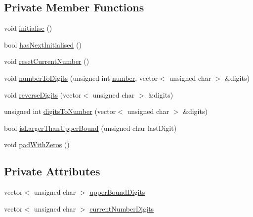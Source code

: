\subsection*{Private Member Functions}
\begin{DoxyCompactItemize}
\item 
void \hyperlink{classmultiscale_1_1LexicographicNumberIterator_a943745c4723ed8c3c18df9f92bf94d2c}{initialise} ()
\item 
bool \hyperlink{classmultiscale_1_1LexicographicNumberIterator_ac2754a1a57005183e2c9040719c97448}{has\-Next\-Initialised} ()
\item 
void \hyperlink{classmultiscale_1_1LexicographicNumberIterator_a18311f68a49156a415c817a947abcd7d}{reset\-Current\-Number} ()
\item 
void \hyperlink{classmultiscale_1_1LexicographicNumberIterator_a700e18593ba0cc764d4e517993bd3fdc}{number\-To\-Digits} (unsigned int \hyperlink{classmultiscale_1_1LexicographicNumberIterator_a282d970d0d1a33d2736bbdf104c18336}{number}, vector$<$ unsigned char $>$ \&digits)
\item 
void \hyperlink{classmultiscale_1_1LexicographicNumberIterator_a4c0a17e03a12256584d9ed3ae19a78c9}{reverse\-Digits} (vector$<$ unsigned char $>$ \&digits)
\item 
unsigned int \hyperlink{classmultiscale_1_1LexicographicNumberIterator_a9bcb610b3b63b02ceed7d556960e57c3}{digits\-To\-Number} (vector$<$ unsigned char $>$ \&digits)
\item 
bool \hyperlink{classmultiscale_1_1LexicographicNumberIterator_a8fad6e84a483cee3bd52c926de73d15f}{is\-Larger\-Than\-Upper\-Bound} (unsigned char last\-Digit)
\item 
void \hyperlink{classmultiscale_1_1LexicographicNumberIterator_a063dc7e6097724e96ed36bab4d20871b}{pad\-With\-Zeros} ()
\end{DoxyCompactItemize}
\subsection*{Private Attributes}
\begin{DoxyCompactItemize}
\item 
vector$<$ unsigned char $>$ \hyperlink{classmultiscale_1_1LexicographicNumberIterator_a909a054ae4d3e79e5daa3059a94000d0}{upper\-Bound\-Digits}
\item 
vector$<$ unsigned char $>$ \hyperlink{classmultiscale_1_1LexicographicNumberIterator_af42ebeea695a31c2da714332c520ae79}{current\-Number\-Digits}
\end{DoxyCompactItemize}
